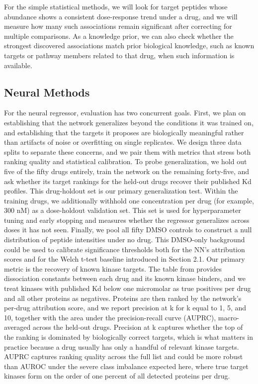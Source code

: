For the simple statistical methods, we will look for target peptides whose abundance shows a consistent dose-response trend under a drug, and we will measure how many such associations remain significant after correcting for multiple comparisons. As a knowledge prior, we can also check whether the strongest discovered associations match prior biological knowledge, such as known targets or pathway members related to that drug, when such information is available.


\subsection{Neural Methods}

For the neural regressor, evaluation has two concurrent goals. First, we plan on establishing that the network generalizes beyond the conditions it was trained on, and establishing that the targets it proposes are biologically meaningful rather than artifacts of noise or overfitting on single replicates. We design three data splits to separate these concerns, and we pair them with metrics that stress both ranking quality and statistical calibration.
To probe generalization, we hold out five of the fifty drugs entirely, train the network on the remaining forty-five, and ask whether its target rankings for the held-out drugs recover their published Kd profiles. This drug-holdout set is our primary generalization test. Within the training drugs, we additionally withhold one concentration per drug (for example, 300 nM) as a dose-holdout validation set. This set is used for hyperparameter tuning and early stopping and measures whether the regressor generalizes across doses it has not seen. Finally, we pool all fifty DMSO controls to construct a null distribution of peptide intensities under no drug. This DMSO-only background could be used to calibrate significance thresholds both for the NN's attribution scores and for the Welch t-test baseline introduced in Section 2.1.
Our primary metric is the recovery of known kinase targets. The table from \cite{klaeger2017target} provides dissociation constants between each drug and its known kinase binders, and we treat kinases with published Kd below one micromolar as true positives per drug and all other proteins as negatives. Proteins are then ranked by the network's per-drug attribution score, and we report precision at k for k equal to 1, 5, and 10, together with the area under the precision-recall curve (AUPRC), macro-averaged across the held-out drugs. Precision at k captures whether the top of the ranking is dominated by biologically correct targets, which is what matters in practice because a drug usually has only a handful of relevant kinase targets. AUPRC captures ranking quality across the full list and could be more robust than AUROC under the severe class imbalance expected here, where true target kinases form on the order of one percent of all detected proteins per drug.

